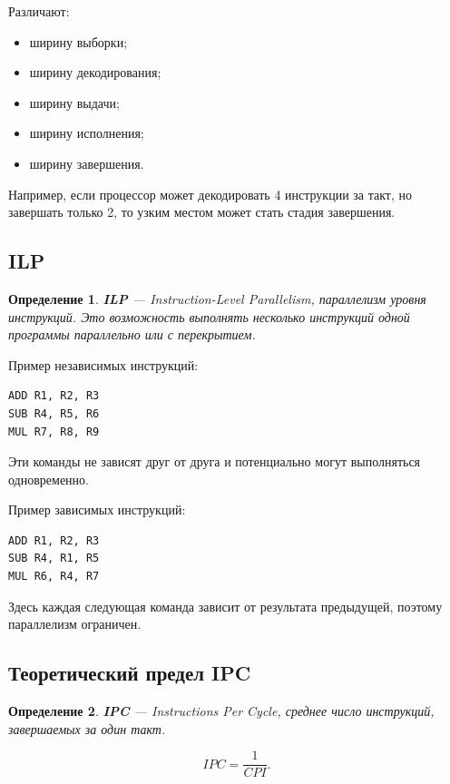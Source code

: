 \documentclass[12pt,a4paper]{article}
\newtheorem{definition}{Определение}
\begin{document}
Различают:

\begin{itemize}
    \item ширину выборки;
    \item ширину декодирования;
    \item ширину выдачи;
    \item ширину исполнения;
    \item ширину завершения.
\end{itemize}

Например, если процессор может декодировать 4 инструкции за такт, но завершать только 2, то узким местом может стать стадия завершения.

\subsection{ILP}

\begin{definition}
\textbf{ILP} --- Instruction-Level Parallelism, параллелизм уровня инструкций. Это возможность выполнять несколько инструкций одной программы параллельно или с перекрытием.
\end{definition}

Пример независимых инструкций:

\begin{lstlisting}
ADD R1, R2, R3
SUB R4, R5, R6
MUL R7, R8, R9
\end{lstlisting}

Эти команды не зависят друг от друга и потенциально могут выполняться одновременно.

Пример зависимых инструкций:

\begin{lstlisting}
ADD R1, R2, R3
SUB R4, R1, R5
MUL R6, R4, R7
\end{lstlisting}

Здесь каждая следующая команда зависит от результата предыдущей, поэтому параллелизм ограничен.

\subsection{Теоретический предел IPC}

\begin{definition}
\textbf{IPC} --- Instructions Per Cycle, среднее число инструкций, завершаемых за один такт.
\end{definition}

\[
    IPC = \frac{1}{CPI}.
\]
\end{document}
